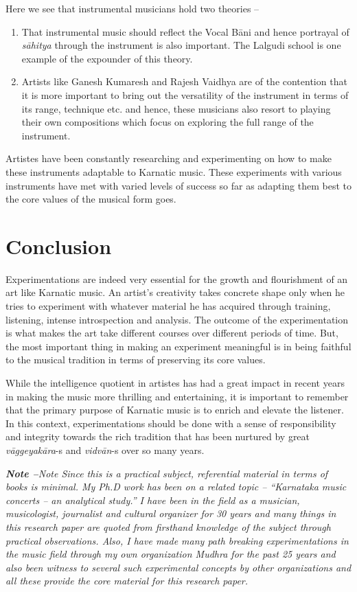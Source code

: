 Here we see that instrumental musicians hold two theories –

\begin{enumerate}
\itemsep=0pt
\item That instrumental music should reflect the Vocal Bāni and hence portrayal of \textit{sāhitya} through the instrument is also important. The Lalgudi school is one example of the expounder of this theory.

 \item Artists like Ganesh Kumaresh and Rajesh Vaidhya are of the contention that it is more important to bring out the versatility of the instrument in terms of its range, technique etc. and hence, these musicians also resort to playing their own compositions which focus on exploring the full range of the instrument.

\end{enumerate}

Artistes have been constantly researching and experimenting on how to make these instruments adaptable to Karnatic music. These experiments with various instruments have met with varied levels of success so far as adapting them best to the core values of the musical form goes.


\section*{Conclusion}

Experimentations are indeed very essential for the growth and flourishment of an art like Karnatic music. An artist’s creativity takes concrete shape only when he tries to experiment with whatever material he has acquired through training, listening, intense introspection and analysis. The outcome of the experimentation is what makes the art take different courses over different periods of time. But, the most important thing in making an experiment meaningful is in being faithful to the musical tradition in terms of preserving its core values.

While the intelligence quotient in artistes has had a great impact in recent years in making the music more thrilling and entertaining, it is important to remember that the primary purpose of Karnatic music is to enrich and elevate the listener. In this context, experimentations should be done with a sense of responsibility and integrity towards the rich tradition that has been nurtured by great \textit{vāggeyakāra}-s and \textit{vidvān}-s over so many years.

\textit{\textbf{Note –}Note Since this is a practical subject, referential material in terms of books is minimal. My Ph.D work has been on a related topic – “Karnataka music concerts – an analytical study.” I have been in the field as a musician, musicologist, journalist and cultural organizer for 30 years and many things in this research paper are quoted from firsthand knowledge of the subject through practical observations. Also, I have made many path breaking experimentations in the music field through my own organization Mudhra for the past 25 years and also been witness to several such experimental concepts by other organizations and all these provide the core material for this research paper.}


